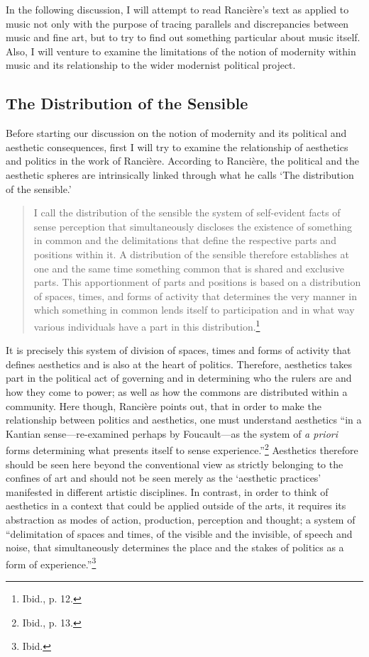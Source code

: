In the following discussion, I will attempt to read Ranci\`{e}re's text as applied to music not only with the purpose of tracing parallels and discrepancies between music and fine art, but to try to find out something particular about music itself. Also, I will venture to examine the limitations of the notion of modernity within music and its relationship to the wider modernist political project.

\subsection{The Distribution of the Sensible}

Before starting our discussion on the notion of modernity and its political and aesthetic consequences, first I will try to examine the relationship of aesthetics and politics in the work of Ranci\`{e}re. According to Ranci\`{e}re, the political and the aesthetic spheres are intrinsically linked through what he calls `The distribution of the sensible.' 
\begin{quote}
I call the distribution of the sensible the system of self-evident facts of sense perception that simultaneously discloses the existence of something in common and the delimitations that define the respective parts and positions within it. A distribution of the sensible therefore establishes at one and the same time something common that is shared and exclusive parts. This apportionment of parts and positions is based on a distribution of spaces, times, and forms of activity that determines the very manner in which something in common lends itself to participation and in what way various individuals have a part in this distribution.\footnote{Ibid., p. 12.}
\end{quote}
It is precisely this system of division of spaces, times and forms of activity that defines aesthetics and is also at the heart of politics. Therefore, aesthetics takes part in the political act of governing and in determining who the rulers are and how they come to power; as well as how the commons are distributed within a community. Here though, Ranci\`{e}re points out, that in order to make the relationship between politics and aesthetics, one must understand aesthetics ``in a Kantian sense---re-examined perhaps by Foucault---as the system of \emph{a priori} forms determining what presents itself to sense experience.''\footnote{Ibid., p. 13.} Aesthetics therefore should be seen here beyond the conventional view as strictly belonging to the confines of art and should not be seen merely as the `aesthetic practices' manifested in different artistic disciplines.  In contrast, in order to think of aesthetics in a context that could be applied outside of the arts, it requires its abstraction as modes of action, production, perception and thought; a system of ``delimitation of spaces and times, of the visible and the invisible, of speech and noise, that simultaneously determines the place and the stakes of politics as a form of experience.''\footnote{Ibid.}
